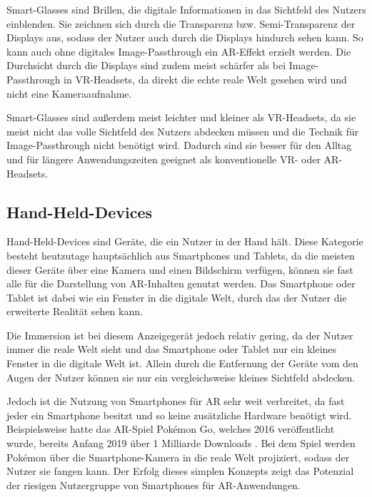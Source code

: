     Smart-Glasses sind Brillen, die digitale Informationen in das Sichtfeld des Nutzers einblenden.
    Sie zeichnen sich durch die Transparenz bzw. Semi-Transparenz der Displays aus, sodass der Nutzer auch durch die Displays hindurch sehen kann.
    So kann auch ohne digitales Image-Passthrough ein AR-Effekt erzielt werden.
    Die Durchsicht durch die Displays sind zudem meist schärfer als bei Image-Passthrough in VR-Headsets, da direkt die echte reale Welt gesehen wird und nicht eine Kameraaufnahme.

    Smart-Glasses sind außerdem meist leichter und kleiner als VR-Headsets, da sie meist nicht das volle Sichtfeld des Nutzers abdecken müssen und die Technik für Image-Passthrough nicht benötigt wird.
    Dadurch sind sie besser für den Alltag und für längere Anwendungszeiten geeignet als konventionelle VR- oder AR-Headsets.




  \subsection{Hand-Held-Devices}

  Hand-Held-Devices sind Geräte, die ein Nutzer in der Hand hält.
  Diese Kategorie besteht heutzutage hauptsächlich aus Smartphones und Tablets, da die meisten dieser Geräte über eine Kamera und einen Bildschirm verfügen, können sie fast alle für die Darstellung von AR-Inhalten genutzt werden.
  Das Smartphone oder Tablet ist dabei wie ein Fenster in die digitale Welt, durch das der Nutzer die erweiterte Realität sehen kann.

  Die Immersion ist bei diesem Anzeigegerät jedoch relativ gering, da der Nutzer immer die reale Welt sieht und das Smartphone oder Tablet nur ein kleines Fenster in die digitale Welt ist.
  Allein durch die Entfernung der Geräte vom den Augen der Nutzer können sie nur ein vergleichsweise kleines Sichtfeld abdecken.

  Jedoch ist die Nutzung von Smartphones für AR sehr weit verbreitet, da fast jeder ein Smartphone besitzt und so keine zusätzliche Hardware benötigt wird.
  Beispielsweise hatte das AR-Spiel Pok\'emon Go, welches 2016 veröffentlicht wurde, bereits Anfang 2019 über 1 Milliarde Downloads \autocite[][]{pokemon-go-stats}.
  Bei dem Spiel werden Pok\'emon über die Smartphone-Kamera in die reale Welt projiziert, sodass der Nutzer sie fangen kann.
  Der Erfolg dieses simplen Konzepts zeigt das Potenzial der riesigen Nutzergruppe von Smartphones für AR-Anwendungen.

